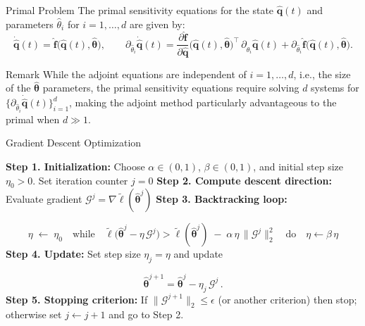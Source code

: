\begin{frame}{Primal Problem}
  The \textcolor{codeblue}{primal} sensitivity equations for the state $\hat{\mathbf{q}}(t)$ and parameters $\hat{\theta}_i$ for $i=1,\dots,d$ are given by:
    $$\dot{\hat{\mathbf{q}}}(t)
      = \hat{\mathbf{f}}\bigl(\hat{\mathbf{q}}(t),\hat{\bm{\theta}}\bigr),
      \qquad
      \partial_{\hat{\theta}_i}\dot{\hat{\mathbf{q}}}(t)
      = \frac{\partial \hat{\mathbf{f}}}{\partial \hat{\mathbf{q}}}
        \bigl(\hat{\mathbf{q}}(t),\hat{\bm{\theta}}\bigr)^{\!\top}
        \,\partial_{\hat{\theta}_i}\hat{\mathbf{q}}(t)
      + \partial_{\hat{\theta}_i}\hat{\mathbf{f}}
        \bigl(\hat{\mathbf{q}}(t),\hat{\bm{\theta}}\bigr).$$

  \begin{block}{Remark}
    While the adjoint equations are independent of $i=1,\dots, d$, i.e., the size of the $\hat{\bm{\theta}}$ parameters, the primal sensitivity equations require solving $d$ systems for 
    $\{\partial_{\hat{\theta}_i} \dot{\hat{\mathbf{q}}}(t)\}_{i=1}^d$, making the adjoint method particularly advantageous to the primal when $d \gg 1$.
  \end{block}
\end{frame}



\begin{frame}{Gradient Descent Optimization}
    
\begin{center}
\begin{minipage}{0.95\textwidth}
\LinesNotNumbered
\begin{algorithm}[H]
\label{algorithm_1}
\SetAlgoLined
\caption{Armijo Backtracking Line Search + Gradient Descent}
\textbf{Step 1. Initialization:} Choose $\alpha\in(0,1)$, $\beta\in(0,1)$, and initial step size $\eta_{0} > 0$. Set iteration counter $j=0$\;
\textbf{Step 2. Compute descent direction:} Evaluate gradient $\mathscr{G}^j = \nabla \tilde\ell(\hat{\bm\theta}^j)$\;
\textbf{Step 3. Backtracking loop:}

$$\eta \;\leftarrow\;\eta_{0}
    \quad\text{while}\quad
    \tilde\ell\bigl(\hat{\bm\theta}^j - \eta\,\mathscr{G}^j\bigr)
    >
    \tilde\ell(\hat{\bm\theta}^j)
    \;-\;\alpha\,\eta\,\|\mathscr{G}^j\|_2^2
    \quad\text{do}\quad
    \eta \leftarrow \beta\,\eta$$
\textbf{Step 4. Update:} Set step size $\eta_j = \eta$ and update

$$\hat{\bm\theta}^{j+1} = \hat{\bm\theta}^j - \eta_j\,\mathscr{G}^j\,.$$
\textbf{Step 5. Stopping criterion:} If $\|\mathscr{G}^{j+1}\|_2\le\epsilon$ (or another criterion) then stop; otherwise set $j\leftarrow j+1$ and go to Step 2.
\end{algorithm}
\end{minipage}
\end{center}

\end{frame}


